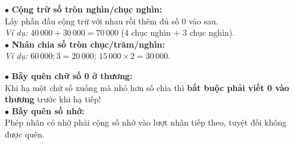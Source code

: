 \documentclass[14pt,a4paper,oneside]{extbook}
\begin{document}
\vspace{2.5mm}

\noindent
\begin{minipage}[t]{0.54\textwidth}
  \begin{tcolorbox}[
    enhanced,
    title={\footnotesize\bfseries\color{white}\faFlash\ Kỹ thuật tính nhẩm siêu tốc},
    colback=green!3!white,
    colframe=green!60!black,
    arc=2.5mm, boxrule=0.8pt, top=1.8mm, bottom=1.8mm, left=2.2mm, right=2.2mm
  ]
    \footnotesize
    $\bullet$ \textbf{Cộng trừ số tròn nghìn/chục nghìn:}\\
    Lấy phần đầu cộng trừ với nhau rồi thêm đủ số 0 vào sau.\\
    \textit{Ví dụ:} $40\,000 + 30\,000 = 70\,000$ (4 chục nghìn + 3 chục nghìn).\\
    $\bullet$ \textbf{Nhân chia số tròn chục/trăm/nghìn:}\\
    \textit{Ví dụ:} $60\,000 : 3 = 20\,000$; $15\,000 \times 2 = 30\,000$.
  \end{tcolorbox}
\end{minipage}%
\hfill
\begin{minipage}[t]{0.44\textwidth}
  \begin{tcolorbox}[
    enhanced,
    title={\footnotesize\bfseries\color{white}\faExclamationTriangle\ Mẹo tránh bẫy trắc nghiệm},
    colback=red!2!white,
    colframe=red!70!black,
    arc=2.5mm, boxrule=0.8pt, top=1.8mm, bottom=1.8mm, left=2.2mm, right=2.2mm
  ]
    \footnotesize
    $\bullet$ \textbf{Bẫy quên chữ số 0 ở thương:}\\
    Khi hạ một chữ số xuống mà nhỏ hơn số chia thì \textbf{bắt buộc phải viết 0 vào thương} trước khi hạ tiếp!\\
    $\bullet$ \textbf{Bẫy quên số nhớ:}\\
    Phép nhân có nhớ phải cộng số nhớ vào lượt nhân tiếp theo, tuyệt đối không được quên.
  \end{tcolorbox}
\end{minipage}
\end{document}
